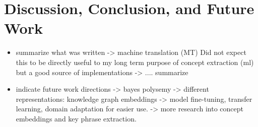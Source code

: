 \section{Discussion, Conclusion, and Future Work}\label{sec:ConcludeAndFuture}

\begin{itemize}
\item summarize what was written
-> machine translation (MT)
Did not expect this to be directly useful to my long term purpose of concept extraction (ml) but a good source of implementations
-> .... summarize

\item indicate future work directions
-> bayes polysemy
-> different representations: knowledge graph embeddings
-> model fine-tuning, transfer learning, domain adaptation for easier use.
-> more research into concept embeddings and key phrase extraction. 
\end{itemize}
